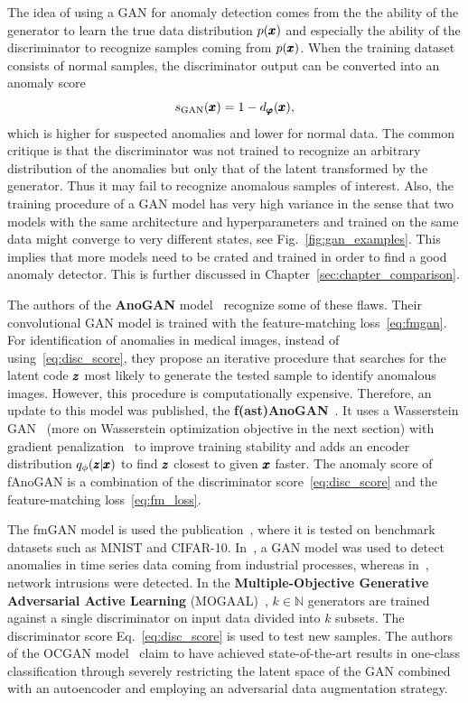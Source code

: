 The idea of using a GAN for anomaly detection comes from the the ability of the generator to learn the true data distribution $p(\pmb{{x}})$ and especially the ability of the discriminator to recognize samples coming from $p(\pmb{{x}})$. When the training dataset consists of normal samples, the discriminator output can be converted into an anomaly score
\begin{equation} \label{eq:disc_score}
     s_{\text{GAN}}(\pmb{{x}}) = 1 - d_{\pmb{{\varphi}}}(\pmb{{x}}),
\end{equation}
which is higher for suspected anomalies and lower for normal data. The common critique is that the discriminator was not trained to recognize an arbitrary distribution of the anomalies but only that of the latent transformed by the generator. Thus it may fail to recognize anomalous samples of interest. Also, the training procedure of a GAN model has very high variance in the sense that two models with the same architecture and hyperparameters and trained on the same data might converge to very different states, see Fig.~\ref{fig:gan_examples}. This implies that more models need to be crated and trained in order to find a good anomaly detector. This is further discussed in Chapter~\ref{sec:chapter_comparison}.

The authors of the \textbf{AnoGAN} model~\cite{schlegl2017unsupervised} recognize some of these flaws. Their convolutional GAN model is trained with the feature-matching loss~\eqref{eq:fmgan}. For identification of anomalies in medical images, instead of using~\eqref{eq:disc_score}, they propose an iterative procedure that searches for the latent code $\pmb{{z}}$ most likely to generate the tested sample to identify anomalous images. However, this procedure is computationally expensive. Therefore, an update to this model was published, the \textbf{f(ast)AnoGAN}~\cite{schleglFAnoGANFastUnsupervised2019}. It uses a Wasserstein GAN~\cite{gulrajani2017improved,haloui2018anomaly} (more on Wasserstein optimization objective in the next section) with gradient penalization~\cite{gulrajani2017improved} to improve training stability and adds an encoder distribution $q_{\phi}(\pmb{{z}}|\pmb{{x}})$ to find $\pmb{{z}}$ closest to given $\pmb{{x}}$ faster. The anomaly score of fAnoGAN is a combination of the discriminator score~\eqref{eq:disc_score} and the feature-matching loss~\eqref{eq:fm_loss}. 

The fmGAN model is used the publication~\cite{kliger2018novelty}, where it is tested on benchmark datasets such as MNIST and CIFAR-10. In~\cite{wang2018generative}, a GAN model was used to detect anomalies in time series data coming from industrial processes, whereas in~\cite{zenatiEfficientGANBasedAnomaly2018}, network intrusions were detected. In the \textbf{Multiple-Objective Generative Adversarial Active Learning} (MOGAAL)~\cite{liu2019generative}, $k \in \mathbb{N}$ generators are trained against a single discriminator on input data divided into $k$ subsets. The discriminator score Eq.~\eqref{eq:disc_score} is used to test new samples. The authors of the OCGAN model~\cite{perera2019ocgan} claim to have achieved state-of-the-art results in one-class classification through severely restricting the latent space of the GAN combined with an autoencoder and employing an adversarial data augmentation strategy. 

